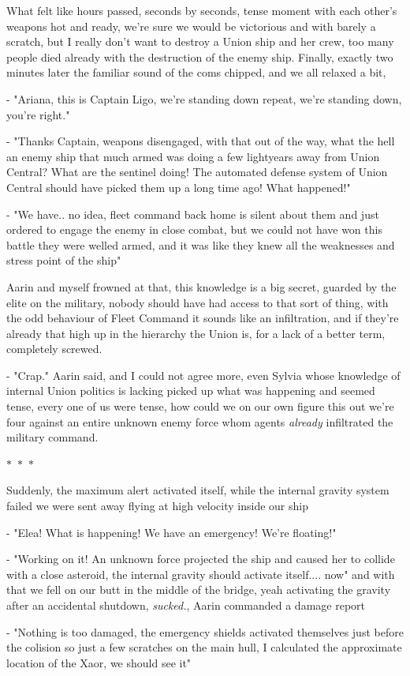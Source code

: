 \documentclass[colorlinks,12pt,a4paper]{book}
\newcommand\sep{\begin{center}
  \boldmath $\ast$~$\ast$~$\ast$
\end{center}}
\begin{document}
What felt like hours passed, seconds by seconds, tense moment with each other's weapons hot and ready, we're sure we would be victorious 
and with barely a scratch, but I really don't want to destroy a Union ship and her crew, too many people died already with the destruction 
of the enemy ship. Finally, exactly two minutes later the familiar sound of the coms chipped, and we all relaxed a bit,\newline\par 
- "Ariana, this is Captain Ligo, we're standing down repeat, we're standing down, you're right."\newline\par
- "Thanks Captain, weapons disengaged, with that out of the way, what the hell an enemy ship that much armed was doing
a few lightyears away from Union Central? What are the sentinel doing! The automated defense system of Union Central should have 
picked them up a long time ago! What happened!"\newline\par 
- "We have.. no idea, fleet command back home is silent about them and just ordered to engage the enemy in close combat,
but we could not have won this battle they were welled armed, and it was like they knew all the weaknesses and stress point of the ship"\par 
\bigskip 

Aarin and myself frowned at that, this knowledge is a big secret, guarded by the elite on the military, nobody should have had access 
to that sort of thing, with the odd behaviour of Fleet Command it sounds like an infiltration, and if they're already that high up in 
the hierarchy the Union is, for a lack of a better term, completely screwed.\par 
\bigskip 

- "Crap." Aarin said, and I could not agree more, even Sylvia whose knowledge of internal Union politics is lacking picked up what was happening
and seemed tense, every one of us were tense, how could we on our own figure this out we're four against an entire unknown enemy force whom agents
\textit{already} infiltrated the military command.

\sep 

Suddenly, the maximum alert activated itself, while the internal gravity system failed we were sent away flying at high 
velocity inside our ship\par 
- "Elea! What is happening! We have an emergency! We're floating!"\newline\par
- "Working on it! An unknown force projected the ship and caused her to collide with a close asteroid, the internal gravity should
activate itself.... now" and with that we fell on our butt in the middle of the bridge, yeah activating the gravity after an accidental 
shutdown, \textit{sucked.}, Aarin commanded a damage report\newline\par
- "Nothing is too damaged, the emergency shields activated themselves just before the colision so just a few scratches on the main hull,
I calculated the approximate location of the Xaor, we should see it"\par 
\bigskip 
\end{document}
